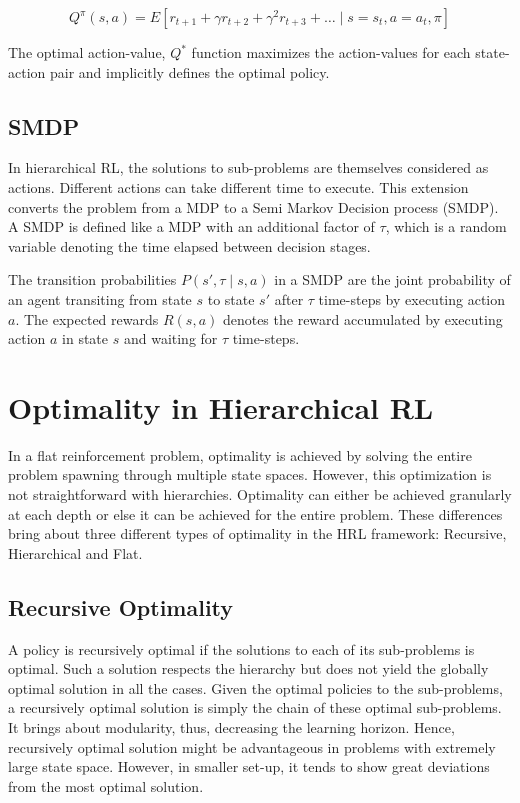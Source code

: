 \begin{equation}
    Q^\pi (s, a)=E[r_{t+1}+\gamma r_{t+2}+ \gamma^2 r_{t+3} + \dots \mid s=s_t, a=a_t, \pi]
\end{equation}

The optimal action-value, \(Q^*\) function maximizes the action-values for each state-action pair and
implicitly defines the optimal policy.

\subsection*{SMDP}

In hierarchical RL, the solutions to sub-problems are themselves considered as actions.
Different actions can take different time to execute.
This extension converts the problem from a MDP to a Semi Markov Decision process (SMDP).
A SMDP is defined like a MDP with an additional factor of \(\tau\), which is
a random variable denoting the time elapsed between decision stages.

The transition probabilities \(P(s', \tau \mid s,a)\) in a SMDP are
the joint probability of an agent transiting from state \(s\) to state \(s'\)  after \(\tau\)
time-steps by executing action \(a\).
The expected rewards \(R(s,a)\) denotes the reward accumulated by executing action
\(a\) in state \(s\) and waiting for \(\tau\) time-steps.

\section*{Optimality in Hierarchical RL}

In a flat reinforcement problem, optimality is achieved by solving the entire problem spawning through multiple
state spaces. However, this optimization is not straightforward with hierarchies.
Optimality can either be achieved granularly at each depth or else it can be achieved for the entire problem.
These differences bring about three different types of optimality in the HRL framework: Recursive, Hierarchical and Flat.

\subsection*{Recursive Optimality}
A policy is recursively optimal if the solutions to each of its sub-problems is optimal.
Such a solution respects the hierarchy but does not yield the globally optimal solution in all the cases.
Given the optimal policies to the sub-problems, a recursively optimal solution is simply the chain of these optimal sub-problems.
It brings about modularity, thus, decreasing the learning horizon.
Hence, recursively optimal solution might be advantageous in problems with extremely large state space.
However, in smaller set-up, it tends to show great deviations from the most optimal solution.

